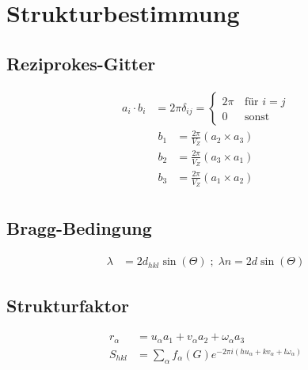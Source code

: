 \section{Strukturbestimmung}

\subsection*{Reziprokes-Gitter}
\begin{equation*}
    \begin{aligned}
        a_i \cdot b_i &= 2 \pi \delta_{ij} = \begin{cases}
            2 \pi & \, \text{für } i = j \\
            0 & \, \text{sonst}
            \end{cases}
    \end{aligned}
\end{equation*}
\begin{equation*}
    \begin{aligned}
        b_1 &= \frac{2 \pi}{V_Z} (a_2 \times a_3) \\
        b_2 &= \frac{2 \pi}{V_Z} (a_3 \times a_1) \\
        b_3 &= \frac{2 \pi}{V_Z} (a_1 \times a_2) \\
    \end{aligned}
\end{equation*}

\subsection*{Bragg-Bedingung}

\begin{equation*}
    \begin{aligned}
        \lambda &= 2d_{hkl} \sin(\Theta) \; ; \; \lambda n = 2d \sin(\Theta)
    \end{aligned}
\end{equation*}

\subsection*{Strukturfaktor}

\begin{equation*}
    \begin{aligned}
        r_{\alpha} &= u_\alpha a_1 + v_\alpha a_2 + \omega_\alpha a_3 \\ 
        S_{hkl} &= \sum_\alpha f_\alpha (G) e^{-2\pi i (hu_\alpha + kv_\alpha + l\omega_\alpha)}
    \end{aligned}
\end{equation*}
 
